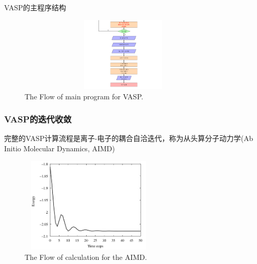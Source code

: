 \begin{frame}[allowframebreaks]{\textrm{VASP}的主程序结构}
\begin{figure}[h!]
\includegraphics[height=1.40in,width=4.0in,viewport=0 0 562 215,clip]{Figures/VASP_main_Flow-4.png}
\caption{\tiny \textrm{The Flow of main program for VASP.}}%
\label{FLOW_of_VASP}
\end{figure}
\end{frame}

\frame
{
	\frametitle{\textrm{VASP}的迭代收敛}
	完整的\textrm{VASP}计算流程是离子-电子的耦合自洽迭代，称为从头算分子动力学\textrm{(Ab Initio Molecular Dynamics, AIMD)}
\vskip 3pt
	{\fontsize{6.2pt}{4.2pt}}
\begin{figure}[h!]
	\vspace{-0.2in}
\centering
\includegraphics[height=1.8in,width=2.6in,viewport=0 0 740 600,clip]{Figures/Ab-initio-Ene.png}
\caption{\tiny \textrm{The Flow of calculation for the AIMD.}}%
\label{PAW_AIMD}
\end{figure} 
}

